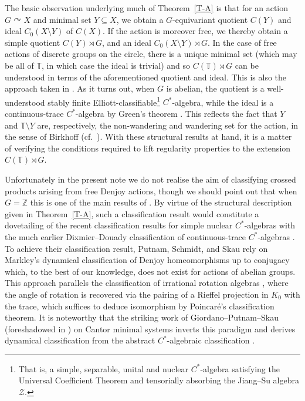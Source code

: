 \documentclass[11pt,a4paper,leqno]{amsart}
\theoremstyle{definition}
\theoremstyle{remark}
\numberwithin{equation}{section}
\theoremstyle{plain}
\newcommand{\Zb}{\mathbb{Z}}
\newcommand{\Tb}{\mathbb{T}}
\newcommand{\Zc}{\mathcal{Z}}
\begin{document}
The basic observation underlying much of Theorem~\ref{T-A} is that for an action $G\curvearrowright X$ and  minimal set $Y\subseteq X$, we obtain a $G$-equivariant quotient $C(Y)$ and ideal $C_0(X\setminus Y)$ of $C(X)$. If the action is moreover free, we thereby obtain a simple quotient $C(Y) \rtimes G$, and an ideal $C_0(X\setminus Y) \rtimes G$. In the case of free actions of discrete groups on the circle, there is a unique minimal set (which may be all of $\Tb$, in which case the ideal is trivial) and so $C(\Tb)\rtimes G$ can be understood in terms of the aforementioned quotient and ideal. This is also the approach taken in \cite{PutSchSka86}. As it turns out, when $G$ is abelian, the quotient is a well-understood stably finite Elliott-classifiable\footnote{That is, a simple, separable, unital and nuclear $C^*$-algebra satisfying the Universal Coefficient Theorem and tensorially absorbing the Jiang--Su algebra $\Zc$.} $C^*$-algebra, while the ideal is a continuous-trace $C^*$-algebra by Green's theorem \cite{Gre77}. This reflects the fact that $Y$ and $\Tb\setminus Y$ are, respectively, the non-wandering and wandering set for the action, in the sense of Birkhoff (cf.~\cite{Tom03}). With these structural results at hand, it is a matter of verifying the conditions required to lift regularity properties to the extension $C(\Tb)\rtimes G$. 

Unfortunately in the present note we do not realise the aim of classifying crossed products arising from free Denjoy actions, though we should point out that when $G = \Zb$ this is one of the main results of \cite{PutSchSka86}. By virtue of the structural description given in Theorem~\ref{T-A}, such a classification result would constitute a dovetailing of the recent classification results for simple nuclear $C^*$-algebras with the much earlier Dixmier--Douady classification of continuous-trace $C^*$-algebras \cite{DixDou63}. To achieve their classification result, Putnam, Schmidt, and Skau rely on Markley's dynamical classification of Denjoy homeomorphisms up to conjugacy \cite{Mar70} which, to the best of our knowledge, does not exist for actions of abelian groups. This approach parallels the classification of irrational rotation algebras \cite{Rie81,PimVoi80b}, where the angle of rotation is recovered via the pairing of a Rieffel projection in $K_0$ with the trace, which suffices to deduce isomorphism by Poincar\'e's classification theorem. It is noteworthy that the striking work of Giordano--Putnam--Skau (foreshadowed in \cite{PutSchSka86}) on Cantor minimal systems inverts this paradigm and derives dynamical classification from the abstract $C^*$-algebraic classification \cite{GioPutSka95}. 
\end{document}
